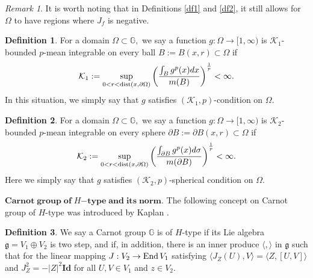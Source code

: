 \documentclass[11pt,twoside]{article}
\theoremstyle{definition}
\newtheorem{defn}{Definition}[section]
\theoremstyle{remark}
\newtheorem*{rem}{Remark}
\begin{document}
\begin{rem} 
It is worth noting that in Definitions \ref{df1} and \ref{df2}, it still allows for $\Omega$ to have regions where $J_{f}$  is negative.
\end{rem}




\begin{defn}
For a domain $\Omega\subset\mathbb{G},$ we say a function $g:\Omega\rightarrow [1,\infty)$ is $\mathcal{K}_{1}$-bounded $p$-mean integrable on every ball $B:=B(x,r)\subset\Omega$ if
\begin{equation}
\mathcal{K}_{1}:=\sup_{0<r<{\rm dist}(x,\partial\Omega)}\left(\frac{\int_{B}g^{p}(x)dx}{m(B)}\right)^{\frac{1}{p}}<\infty.
\end{equation}
In this situation, we simply say that $g$ satisfies $(\mathcal{K}_{1},p)$-condition on $\Omega.$
\end{defn}

\begin{defn}
For a domain $\Omega\subset\mathbb{G},$ we say a function $g:\Omega\rightarrow [1,\infty)$ is $\mathcal{K}_{2}$-bounded $p$-mean integrable on every sphere $\partial B:=\partial B(x,r)\subset\Omega$ if 
\begin{equation}
\mathcal{K}_{2}:=\sup_{0<r<{\rm dist}(x,\partial\Omega)}\left(\frac{\int_{\partial B}g^{p}(x)d\sigma}{m(\partial B)}\right)^{\frac{1}{p}}<\infty.
\end{equation}
Here we simply say that $g$ satisfies $(\mathcal{K}_{2},p)$-spherical condition on $\Omega.$
\end{defn}







$\mathbf{Carnot\;group\;of\;}$$H$$\mathbf{-type\;and\;its\;norm}.$ The following concept on Carnot group of $H$-type was introduced by Kaplan \cite{Kap80}.
\begin{defn}\cite{Kap80}
We say a Carnot group $\mathbb{G}$ is of $H$-type if its Lie algebra $\mathfrak{g}=V_{1}\oplus V_{2}$ is two step, and if, in addition, there is an inner produce $\langle,\rangle$ in $\mathfrak{g}$ such that for the linear mapping $J:V_{2}\rightarrow{\rm End}\,V_{1}$
satisfying $\langle J_{Z}(U),V\rangle=\langle Z,[U,V]\rangle$
and $J_{Z}^{2}=-\vert Z\vert^{2} \mathbf{Id}$ for all $U,V\in V_{1}$ and $z\in V_{2}.$
\end{defn}
\end{document}
